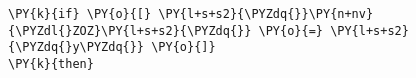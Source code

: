 \begin{Verbatim}[commandchars=\\\{\}]
\PY{k}{if} \PY{o}{[} \PY{l+s+s2}{\PYZdq{}}\PY{n+nv}{\PYZdl{}ZOZ}\PY{l+s+s2}{\PYZdq{}} \PY{o}{=} \PY{l+s+s2}{\PYZdq{}y\PYZdq{}} \PY{o}{]}
\PY{k}{then}
\end{Verbatim}
